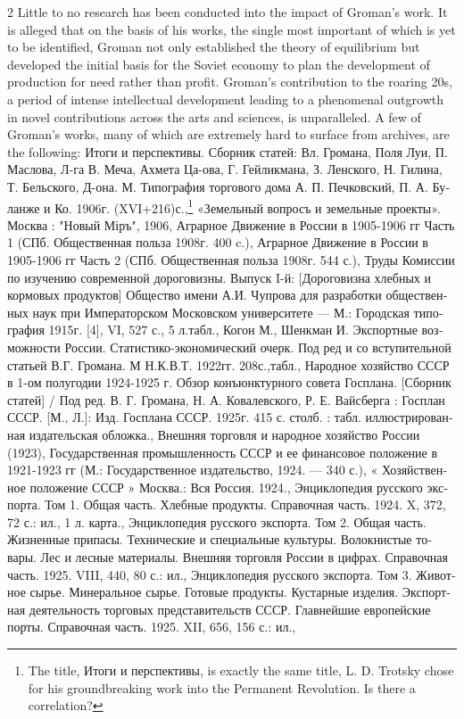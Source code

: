 \documentclass[10pt,a4paper,twoside]{article} %
\begin{document}
\begin{multicols}{2}
{\newline \indent Little to no research has been conducted into the impact of Groman's work. It is alleged that on the basis of his works, the single most important of which is yet to be identified, Groman not only established the theory of equilibrium but developed the initial basis for the Soviet economy to plan the development of production for need rather than profit. Groman's contribution to the roaring 20s, a period of intense intellectual development leading to a phenomenal outgrowth in novel contributions across the arts and sciences, is unparalleled. \newline \indent A few of Groman's works, many of which are extremely hard to surface from archives, are the following: \textrussian{Итоги и перспективы. Сборник статей: Вл. Громана, Поля Луи, П. Маслова, Л-га В. Меча, Ахмета Ца-ова, Г. Гейликмана, З. Ленского, Н. Гилина, Т. Бельского, Д-она. М. Типография торгового дома А. П. Печковский, П. А. Буланже и Ко. 1906г. (XVI+216)с.},\footnote{ The title, \textrussian{Итоги и перспективы}, is exactly the same title, L. D. Trotsky chose for his groundbreaking work into the Permanent Revolution. Is there a correlation?} \textrussian{«Земельный вопросъ и земельные проекты». Москва : "Новый Міръ", 1906}, \textrussian{Аграрное Движение в России в 1905-1906 гг Часть 1}  (\textrussian{СПб. Общественная польза 1908г. 400 c.}), \textrussian{Аграрное Движение в России в 1905-1906 гг Часть 2} (\textrussian{СПб. Общественная польза 1908г. 544 с.}), \textrussian{Труды Комиссии по изучению современной дороговизны. Выпуск I-й: [Дороговизна хлебных и кормовых продуктов] Общество имени А.И. Чупрова для разработки общественных наук при Императорском Московском университете — М.: Городская типография 1915г. [4], VI, 527 с., 5 л.табл.}, \textrussian{Когон М., Шенкман И. Экспортные возможности России. Статистико-экономический очерк. Под ред и со вступительной статьей В.Г. Громана. М Н.К.В.Т. 1922гг. 208с.,табл.}, \textrussian{Народное хозяйство СССР в 1-ом полугодии 1924-1925 г. Обзор конъюнктурного совета Госплана. [Сборник статей] / Под ред. В. Г. Громана, Н. А. Ковалевского, Р. Е. Вайсберга : Госплан СССР.  [М., Л.]: Изд. Госплана СССР. 1925г. 415 с. столб. : табл.  иллюстрированная издательская обложка.}, \textrussian{Внешняя торговля и народное хозяйство России} (1923), \textrussian{Государственная промышленность СССР и ее финансовое положение в 1921-1923 гг} (\textrussian{М.: Государственное издательство, 1924. — 340 с.}), \textrussian{« Хозяйственное положение СССР » Москва.: Вся Россия. 1924.}, \textrussian{Энциклопедия русского экспорта. Том 1. Общая часть. Хлебные продукты. Справочная часть. 1924. X, 372, 72 с.: ил., 1 л. карта.}, \textrussian{Энциклопедия русского экспорта. Том 2. Общая часть. Жизненные припасы. Технические и специальные культуры. Волокнистые товары. Лес и лесные материалы. Внешняя торговля России в цифрах. Справочная часть. 1925. VIII, 440, 80 с.: ил.}, \textrussian{Энциклопедия русского экспорта. Том 3. Животное сырье. Минеральное сырье. Готовые продукты. Кустарные изделия. Экспортная деятельность торговых представительств СССР. Главнейшие европейские порты. Справочная часть. 1925. XII, 656, 156 с.: ил.}, }
\end{multicols}
\end{document}
